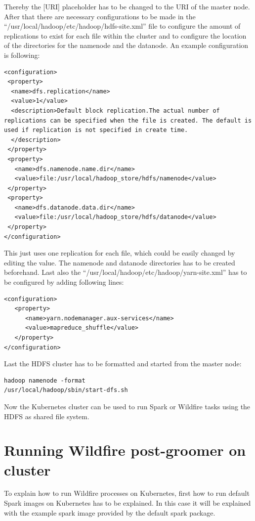 Thereby the [URI] placeholder has to be changed to the URI of the master node. After that there are necessary configurations to be made in the ``/usr/local/hadoop/etc/hadoop/hdfs-site.xml'' file to configure the amount of replications to exist for each file within the cluster and to configure the location of the directories for the namenode and the datanode. An example configuration is following:
\begin{lstlisting}[caption={Configurations hdfs-site.xml},captionpos=b]
<configuration>
 <property>
  <name>dfs.replication</name>
  <value>1</value>
  <description>Default block replication.The actual number of replications can be specified when the file is created. The default is used if replication is not specified in create time.
  </description>
 </property>
 <property>
   <name>dfs.namenode.name.dir</name>
   <value>file:/usr/local/hadoop_store/hdfs/namenode</value>
 </property>
 <property>
   <name>dfs.datanode.data.dir</name>
   <value>file:/usr/local/hadoop_store/hdfs/datanode</value>
 </property>
</configuration>
\end{lstlisting}
This just uses one replication for each file, which could be easily changed by editing the value. The namenode and datanode directories has to be created beforehand. Last also the ``/usr/local/hadoop/etc/hadoop/yarn-site.xml'' has to be configured by adding following lines:
\begin{lstlisting}[caption={Configurations yarn-site.xml},captionpos=b]
<configuration>
   <property>
      <name>yarn.nodemanager.aux-services</name>
      <value>mapreduce_shuffle</value>
   </property>
</configuration>
\end{lstlisting}

Last the HDFS cluster has to be formatted and started from the master node:
\begin{lstlisting}[caption={Start hadoop cluster},captionpos=b]
hadoop namenode -format
/usr/local/hadoop/sbin/start-dfs.sh
\end{lstlisting}

Now the Kubernetes cluster can be used to run Spark or Wildfire tasks using the HDFS as shared file system.

\section{Running Wildfire post-groomer on cluster}

To explain how to run Wildfire processes on Kubernetes, first  how to run default Spark images on Kubernetes has to be explained. In this case it will be explained with the example spark image provided by the default spark package.

